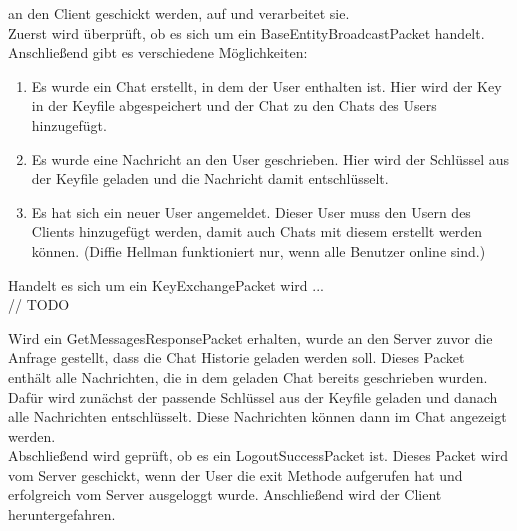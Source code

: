 \begin{itemize}
    an den Client geschickt werden, auf und verarbeitet sie. \\
    Zuerst wird überprüft, ob es sich um ein BaseEntityBroadcastPacket handelt. Anschließend gibt es verschiedene
    Möglichkeiten: \\
    \begin{enumerate}
        \item Es wurde ein Chat erstellt, in dem der User enthalten ist. Hier wird der Key in der Keyfile abgespeichert
        und der Chat zu den Chats des Users hinzugefügt.
        \item Es wurde eine Nachricht an den User geschrieben. Hier wird der Schlüssel aus der Keyfile geladen und die
        Nachricht damit entschlüsselt.
        \item Es hat sich ein neuer User angemeldet. Dieser User muss den Usern des Clients hinzugefügt werden, damit auch
        Chats mit diesem erstellt werden können. (Diffie Hellman funktioniert nur, wenn alle Benutzer online sind.)
    \end{enumerate}
    
    Handelt es sich um ein KeyExchangePacket wird ... \\
    // TODO
    
    Wird ein GetMessagesResponsePacket erhalten, wurde an den Server zuvor die Anfrage gestellt, dass die Chat Historie
    geladen werden soll. Dieses Packet enthält alle Nachrichten, die in dem geladen Chat bereits geschrieben wurden.
    Dafür wird zunächst der passende Schlüssel aus der Keyfile geladen und danach alle Nachrichten entschlüsselt.
    Diese Nachrichten können dann im Chat angezeigt werden. \\
    
    Abschließend wird geprüft, ob es ein LogoutSuccessPacket ist. Dieses Packet wird vom Server geschickt, wenn der
    User die exit Methode aufgerufen hat und erfolgreich vom Server ausgeloggt wurde. Anschließend wird der Client
    heruntergefahren.\\
    


\end{itemize}


